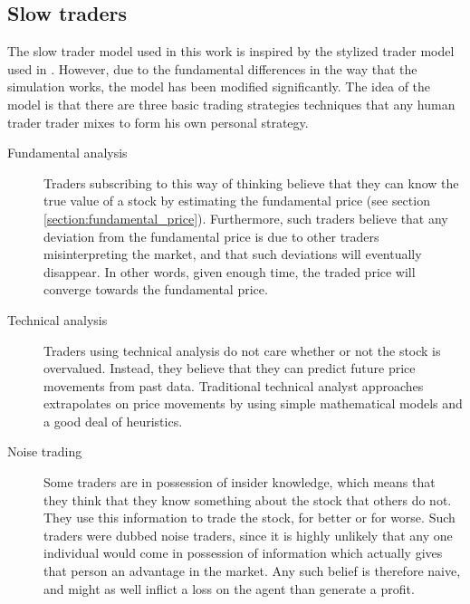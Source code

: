 \subsection{Slow traders}\label{section:slow_traders}
The slow trader model used in this work is inspired by the stylized trader model used in \cite{chiwang2013investigating, chiarella2009impact, gsell2008assessing}. However, due to the fundamental differences in the way that the simulation works, the model has been modified significantly. 
The idea of the model is that there are three basic trading strategies techniques that any human trader trader mixes to form his own personal strategy. 
\begin{description}
\item[Fundamental analysis] Traders subscribing to this way of thinking believe that they can know the true value of a stock by estimating the fundamental price (see section \ref{section:fundamental_price}). Furthermore, such traders believe that any deviation from the fundamental price is due to other traders misinterpreting the market, and that such deviations will eventually disappear. In other words, given enough time, the traded price will converge towards the fundamental price. 
\item[Technical analysis] Traders using technical analysis do not care whether or not the stock is overvalued. Instead, they believe that they can predict future price movements from past data. Traditional technical analyst approaches extrapolates on price movements by using simple mathematical models and a good deal of heuristics.
\item[Noise trading] Some traders are in possession of insider knowledge, which means that they think that they know something about the stock that others do not. They use this information to trade the stock, for better or for worse. Such traders were dubbed noise traders, since it is highly unlikely that any one individual would come in possession of information which actually gives that person an advantage in the market. Any such belief is therefore naive, and might as well inflict a loss on the agent than generate a profit.
\end{description}

